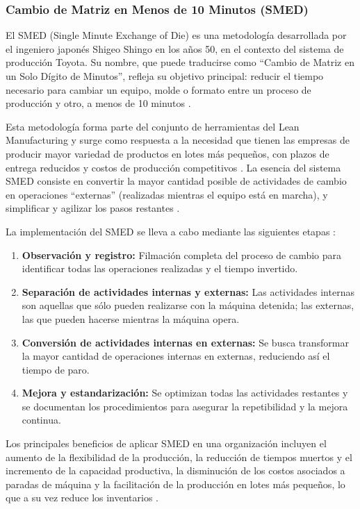 \documentclass[12pt, letterpaper]{article}
\begin{document}
\subsubsection{Cambio de Matriz en Menos de 10 Minutos (SMED)}

El SMED (Single Minute Exchange of Die) es una metodología desarrollada por el ingeniero japonés
Shigeo Shingo en los años 50, en el contexto del sistema de producción Toyota. Su nombre, que
puede traducirse como ``Cambio de Matriz en un Solo Dígito de Minutos'', refleja su objetivo
principal: reducir el tiempo necesario para cambiar un equipo, molde o formato entre un proceso
de producción y otro, a menos de 10 minutos \cite{randstad2026}.

Esta metodología forma parte del conjunto de herramientas del Lean Manufacturing y surge como
respuesta a la necesidad que tienen las empresas de producir mayor variedad de productos en lotes
más pequeños, con plazos de entrega reducidos y costos de producción competitivos \cite{seas2025}.
La esencia del sistema SMED consiste en convertir la mayor cantidad posible de actividades de
cambio en operaciones ``externas'' (realizadas mientras el equipo está en marcha), y simplificar
y agilizar los pasos restantes \cite{leanproduction}.

La implementación del SMED se lleva a cabo mediante las siguientes etapas \cite{seas2025}:

\begin{enumerate}[leftmargin=1.5em, itemsep=2pt]
  \item \textbf{Observación y registro:} Filmación completa del proceso de cambio para identificar
        todas las operaciones realizadas y el tiempo invertido.
  \item \textbf{Separación de actividades internas y externas:} Las actividades internas son
        aquellas que sólo pueden realizarse con la máquina detenida; las externas, las que pueden
        hacerse mientras la máquina opera.
  \item \textbf{Conversión de actividades internas en externas:} Se busca transformar la mayor
        cantidad de operaciones internas en externas, reduciendo así el tiempo de paro.
  \item \textbf{Mejora y estandarización:} Se optimizan todas las actividades restantes y se
        documentan los procedimientos para asegurar la repetibilidad y la mejora continua.
\end{enumerate}

Los principales beneficios de aplicar SMED en una organización incluyen el aumento de la
flexibilidad de la producción, la reducción de tiempos muertos y el incremento de la capacidad
productiva, la disminución de los costos asociados a paradas de máquina y la facilitación de la
producción en lotes más pequeños, lo que a su vez reduce los inventarios \cite{seas2025}.
\end{document}
